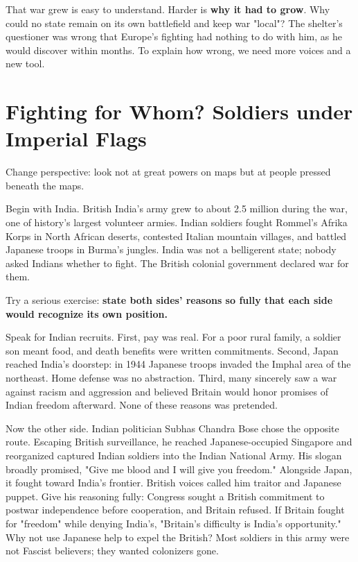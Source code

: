 That war grew is easy to understand. Harder is \textbf{why it had to grow}. Why could no state remain on its own battlefield and keep war "local"? The shelter's questioner was wrong that Europe's fighting had nothing to do with him, as he would discover within months. To explain how wrong, we need more voices and a new tool.

\section[Soldiers under Imperial Flags]{Fighting for Whom? Soldiers under Imperial Flags}
Change perspective: look not at great powers on maps but at people pressed beneath the maps.

Begin with India. British India's army grew to about 2.5 million during the war, one of history's largest volunteer armies. Indian soldiers fought Rommel's Afrika Korps in North African deserts, contested Italian mountain villages, and battled Japanese troops in Burma's jungles. India was not a belligerent state; nobody asked Indians whether to fight. The British colonial government declared war for them.

Try a serious exercise: \textbf{state both sides' reasons so fully that each side would recognize its own position.}

Speak for Indian recruits. First, pay was real. For a poor rural family, a soldier son meant food, and death benefits were written commitments. Second, Japan reached India's doorstep: in 1944 Japanese troops invaded the Imphal area of the northeast. Home defense was no abstraction. Third, many sincerely saw a war against racism and aggression and believed Britain would honor promises of Indian freedom afterward. None of these reasons was pretended.

Now the other side. Indian politician Subhas Chandra Bose chose the opposite route. Escaping British surveillance, he reached Japanese-occupied Singapore and reorganized captured Indian soldiers into the Indian National Army. His slogan broadly promised, "Give me blood and I will give you freedom." Alongside Japan, it fought toward India's frontier. British voices called him traitor and Japanese puppet. Give his reasoning fully: Congress sought a British commitment to postwar independence before cooperation, and Britain refused. If Britain fought for "freedom" while denying India's, "Britain's difficulty is India's opportunity." Why not use Japanese help to expel the British? Most soldiers in this army were not Fascist believers; they wanted colonizers gone.

